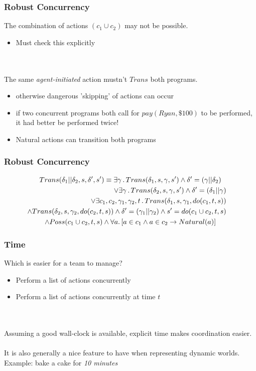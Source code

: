 \documentclass[compress]{beamer}
\begin{document}
\begin{frame}
\frametitle{Robust Concurrency}
The combination of actions $(c_1\cup c_2)$ may not be possible.
\begin{itemize}
  \item Must check this explicitly
\end{itemize}
\ \\
\ \\
The same \emph{agent-initiated} action mustn't $Trans$ both programs.
\begin{itemize}
  \item otherwise dangerous 'skipping' of actions can occur
  \item if two concurrent programs both call for $pay(Ryan,\$100)$ to be performed, it had better be performed twice!
  \item Natural actions can transition both programs
\end{itemize}
\end{frame}

\begin{frame}
\frametitle{Robust Concurrency}
\begin{multline*}
Trans(\delta_{1}||\delta_{2},s,\delta',s')\equiv\exists\gamma\,.\, Trans(\delta_{1},s,\gamma,s')\wedge\delta'=(\gamma||\delta_{2})\\
\shoveright{\vee\exists\gamma\,.\, Trans(\delta_{2},s,\gamma,s')\wedge\delta'=(\delta_{1}||\gamma)}\\
\shoveright{\vee\exists c_{1},c_{2},\gamma_{1},\gamma_{2},t\,.\, Trans(\delta_{1},s,\gamma_{1},do(c_{1},t,s))}\\
\shoveright{\wedge Trans(\delta_{2},s,\gamma_{2},do(c_{2},t,s))\wedge\delta'=(\gamma_1||\gamma_2)\wedge s'=do(c_1\cup c_2,t,s)}\\
\wedge Poss(c_1\cup c_2,t,s)\wedge\forall a.\left[a\in c_{1}\wedge a\in c_{2}\rightarrow Natural(a)\right]
\end{multline*}
\end{frame}

\begin{frame}
\frametitle{Time}
Which is easier for a team to manage?
\begin{itemize}
  \pause
  \item Perform a list of actions concurrently
  \pause
  \item Perform a list of actions concurrently at time $t$
\end{itemize}
\ \\
\ \\
\pause
Assuming a good wall-clock is available, explicit time makes coordination easier.\\
\ \\
It is also generally a nice feature to have when representing dynamic worlds.
Example: bake a cake for \emph{10 minutes}
\end{frame}
\end{document}

